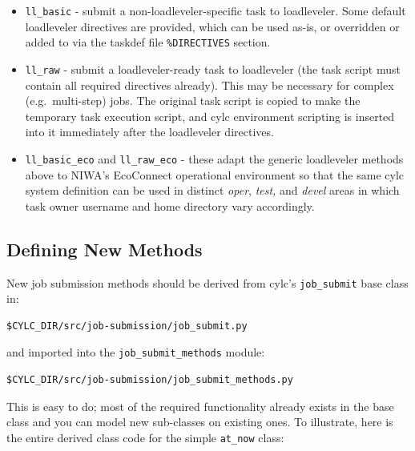 \documentclass[11pt,a4paper]{article}
\begin{document}
\lstset{language=cylctaskdef}

\begin{itemize} 
    
    \item \lstinline=ll_basic= - submit a non-loadleveler-specific task
        to loadleveler. Some default loadleveler directives are
        provided, which can be used as-is, or overridden or added to
        via the taskdef file \lstinline=%DIRECTIVES= section.

    \item \lstinline=ll_raw= - submit a loadleveler-ready task to loadleveler (the task 
        script must contain all required directives already). This may be necessary for
        complex (e.g.\ multi-step) jobs. The original task script is copied to
        make the temporary task execution script, and cylc environment
        scripting is inserted into it immediately after the loadleveler directives.

    \item \lstinline=ll_basic_eco= and \lstinline=ll_raw_eco= - these
        adapt the generic loadleveler methods above to NIWA's EcoConnect
        operational environment so that the same cylc system definition
        can be used in distinct {\em oper}, {\em test,} and {\em devel}
        areas in which task owner username and home directory vary
        accordingly.

\end{itemize}


\subsection{Defining New Methods}

New job submission methods should be derived from cylc's
\lstinline=job_submit= base class in:

\begin{lstlisting}
$CYLC_DIR/src/job-submission/job_submit.py
\end{lstlisting}

and imported into the \lstinline=job_submit_methods= module:

\begin{lstlisting}
$CYLC_DIR/src/job-submission/job_submit_methods.py
\end{lstlisting}

This is easy to do; most of the required functionality already exists in
the base class and you can model new sub-classes on existing ones. To
illustrate, here is the entire derived class code for the simple 
\lstinline=at_now= class:
\end{document}

